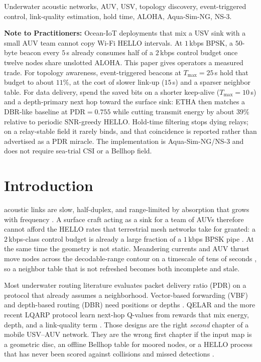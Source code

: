 \documentclass[journal]{IEEEtran}
\begin{document}
\begin{IEEEkeywords}
Underwater acoustic networks, AUV, USV, topology discovery, event-triggered
control, link-quality estimation, hold time, ALOHA, Aqua-Sim-NG, NS-3.
\end{IEEEkeywords}

\noindent\textbf{Note to Practitioners:}
Ocean-IoT deployments that mix a USV sink with a small AUV team cannot
copy Wi-Fi HELLO intervals. At $1$\,kbps BPSK, a $50$-byte beacon every
$5$\,s already consumes half of a $2$\,kbps control budget once twelve
nodes share unslotted ALOHA. This paper gives operators a measured
trade. For topology awareness, event-triggered beacons at
$T_{\max}=25$\,s hold that budget to about $11\%$, at the cost of slower
link-up ($15$\,s) and a sparser neighbor table. For data delivery, spend
the saved bits on a shorter keep-alive ($T_{\max}=10$\,s) and a
depth-primary next hop toward the surface sink: ETHA then matches a
DBR-like baseline at $\mathrm{PDR}=0.755$ while cutting transmit energy
by about $39\%$ relative to periodic SNR-greedy HELLO. Hold-time filtering
stops dying relays; on a relay-stable field it rarely binds, and that
coincidence is reported rather than advertised as a PDR miracle.
The implementation is Aqua-Sim-NG/NS-3 and does not require sea-trial CSI
or a Bellhop field.

\section{Introduction}
 acoustic links are slow, half-duplex, and
range-limited by absorption that grows with frequency
\cite{stojanovic2007capacity,stojanovic2009channels,urick1983sound}.
A surface craft acting as a sink for a team of AUVs therefore cannot
afford the HELLO rates that terrestrial mesh networks take for granted:
a $2$\,kbps-class control budget is already a large fraction of a
$1$\,kbps BPSK pipe \cite{liu2026lqarp,sozer2000uan,akyildiz2005uasn}.
At the same time the geometry is not static. Meandering currents and AUV
thrust move nodes across the decodable-range contour on a timescale of
tens of seconds \cite{caruso2008mcm}, so a neighbor table that is not
refreshed becomes both incomplete and stale.

Most underwater routing literature evaluates packet delivery ratio
(PDR) on a protocol that already assumes a neighborhood.
Vector-based forwarding (VBF) and depth-based routing (DBR) need
positions or depths \cite{xie2006vbf,yan2008dbr}.
QELAR and the more recent LQARP protocol learn next-hop Q-values from
rewards that mix energy, depth, and a link-quality term
\cite{hu2010qelar,liu2026lqarp}. Those designs are the right
\emph{second} chapter of a mobile USV--AUV network. They are the wrong
first chapter if the input map is a geometric disc, an offline Bellhop
table for moored nodes, or a HELLO process that has never been scored
against collisions and missed detections
\cite{casari2011protocol,chitre2008uwa,heidemann2012uwsns}.
\end{document}
